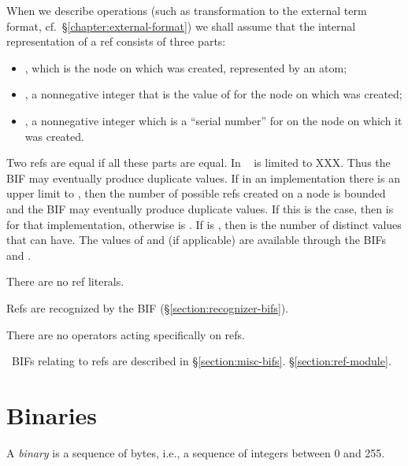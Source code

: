 When we describe operations (such as transformation to the external
term format, cf.~\S\ref{chapter:external-format}) we shall assume that
the internal representation of a ref  consists of three parts:
\begin{itemize}
\item {}, which is the node on which  was created,
represented by an atom;
\item {}, a nonnegative integer that is the value of
 for the node  on which  was created;
\item {}, a nonnegative integer which is a
``serial number'' for  on the node on which it was created.
\end{itemize}
Two refs are equal if all these parts are equal.
\ifOld
In \OldErlang\  is limited to XXX.  Thus the BIF 
may eventually produce duplicate values.
\fi
\ifStd
If in an implementation there is an upper limit to , then
the number of possible refs created on a node is bounded and the BIF
 may eventually produce duplicate values.  If this is
the case, then  is  for that implementation,
otherwise  is .  If  is
, then  is the number of distinct values that
 can have.  The values of  and
 (if applicable) are available through the BIFs
 and .
\fi

There are no ref literals.

Refs are recognized by the BIF
\ifOld {} \fi
\ifStd {} \fi (\S\ref{section:recognizer-bifs}).

There are no operators acting specifically on refs.

\Erlang\ BIFs relating to refs are described in
\ifOld \S\ref{section:misc-bifs}.\fi
\ifStd \S\ref{section:ref-module}.\fi
{}

\section{Binaries}

\label{section:binaries}

A \emph{binary} is a sequence of bytes, i.e., a sequence of
integers between 0 and 255.

